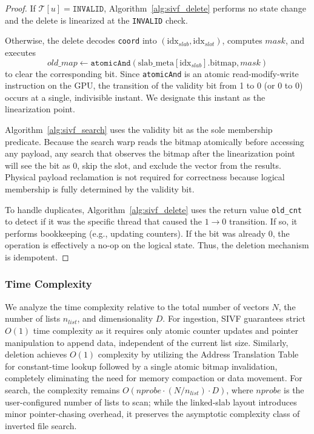 \documentclass[sigconf,nonacm]{acmart}
\theoremstyle{plain}
\theoremstyle{definition}
\theoremstyle{remark}
\begin{document}
\begin{proof}
If $\mathcal{T}[u]=\texttt{INVALID}$, Algorithm~\ref{alg:sivf_delete} performs no state change and the delete is linearized
at the \texttt{INVALID} check.

Otherwise, the delete decodes \texttt{coord} into $(\text{idx}_{slab},\text{idx}_{slot})$, computes
$mask$, and executes
\[old\_map \gets \texttt{atomicAnd}(\text{slab\_meta}[\text{idx}_{slab}].\text{bitmap}, mask)\] to clear the corresponding bit.
Since \texttt{atomicAnd} is an atomic read-modify-write instruction on the GPU, the transition of the validity bit from 1 to 0 (or 0 to 0) occurs at a single, indivisible instant.
We designate this instant as the linearization point.

Algorithm~\ref{alg:sivf_search} uses the validity bit as the sole membership predicate.
Because the search warp reads the bitmap atomically before accessing any payload, any search that observes the bitmap
after the linearization point will see the bit as 0, skip the slot, and exclude the vector from the results.
Physical payload reclamation is not required for correctness because logical membership is fully determined by the validity bit.

To handle duplicates, Algorithm~\ref{alg:sivf_delete} uses the return value \texttt{old\_cnt} to detect if it was the specific thread
that caused the $1 \to 0$ transition. If so, it performs bookkeeping (e.g., updating counters). If the bit was already 0,
the operation is effectively a no-op on the logical state. Thus, the deletion mechanism is idempotent.
\end{proof}

\subsubsection{Time Complexity}
We analyze the time complexity relative to the total number of vectors $N$, the number of lists $n_{list}$, and dimensionality $D$. For ingestion, SIVF guarantees strict $O(1)$ time complexity as it requires only atomic counter updates and pointer manipulation to append data, independent of the current list size. Similarly, deletion achieves $O(1)$ complexity by utilizing the Address Translation Table for constant-time lookup followed by a single atomic bitmap invalidation, completely eliminating the need for memory compaction or data movement. For search, the complexity remains $O(nprobe \cdot (N/n_{list}) \cdot D)$, where $nprobe$ is the user-configured number of lists to scan; while the linked-slab layout introduces minor pointer-chasing overhead, it preserves the asymptotic complexity class of inverted file search.
\end{document}
